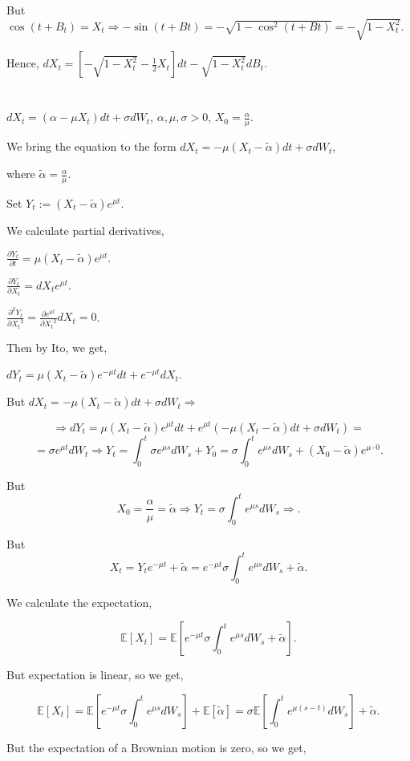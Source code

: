 \documentclass{article}
\begin{document}
But $\cos(t+B_t)=X_t\Rightarrow{-\sin(t+Bt)=-\sqrt{1-\cos^2(t+Bt)}}=-\sqrt{1-X_t^2}$.

Hence, $dX_t=[-\sqrt{1-X_t^2}-\frac{1}{2}X_t]dt-\sqrt{1-X_t^2}dB_t$.
\section{}
$dX_t=(\alpha-\mu{X_t})dt+\sigma{dW_t}$, $\alpha,\mu,\sigma>0$, $X_0=\frac{\alpha}{\mu}$.

We bring the equation to the form $dX_t=-\mu(X_t-\tilde\alpha)dt+\sigma{dW_t}$, 

where $\tilde\alpha=\frac{\alpha}{\mu}$.

Set $Y_t:=(X_t-\tilde\alpha)e^{\mu{t}}$.

We calculate partial derivatives,

$\frac{\partial{Y_t}}{\partial{t}}=\mu(X_t-\tilde\alpha)e^{\mu{t}}$.

$\frac{\partial{Y_t}}{\partial{X_t}}=dX_te^{\mu{t}}$.

$\frac{\partial^2{Y_t}}{\partial{X_t}^2}=\frac{\partial{e^{\mu{t}}}}{\partial{X_t}^2}dX_t=0$.

Then by Ito, we get,

$dY_t=\mu(X_t-\tilde\alpha)e^{-\mu{t}}dt+e^{-\mu{t}}dX_t$.

But $dX_t=-\mu(X_t-\tilde\alpha)dt+\sigma{dW_t}\Rightarrow$

\[\Rightarrow{dY_t=\mu(X_t-\tilde\alpha)e^{\mu{t}}dt+e^{\mu{t}}(-\mu(X_t-\tilde\alpha)dt+\sigma{dW_t})}=\]\[=\sigma{e^{\mu{t}}}dW_t\Rightarrow{Y_t=\int_0^t\sigma{e^{\mu{s}}}dW_s}+Y_0=\sigma\int_0^t{e^{\mu{s}}}dW_s+(X_0-\tilde\alpha)e^{\mu\cdot{0}}.\]

But \[X_0=\frac{\alpha}{\mu}=\tilde\alpha\Rightarrow{Y_t=\sigma\int_0^t{e^{\mu{s}}}dW_s}\Rightarrow.\]

But \[X_t=Y_t{e^{-\mu{t}}}+\tilde\alpha=e^{-\mu{t}}\sigma\int_0^t{e^{\mu{s}}dW_s}+\tilde\alpha.\]

We calculate the expectation,

\[\mathbb{E}[X_t]=\mathbb{E}[e^{-\mu{t}}\sigma\int_0^t{e^{\mu{s}}dW_s}+\tilde\alpha].\]

But expectation is linear, so we get,

\[\mathbb{E}[X_t]=\mathbb{E}[e^{-\mu{t}}\sigma\int_0^t{e^{\mu{s}}dW_s}]+\mathbb{E}[\tilde\alpha]=\sigma\mathbb{E}[\int_0^t{e^{\mu(s-t)}dW_s}]+\tilde\alpha.\]

But the expectation of a Brownian motion is zero, so we get,
\end{document}
